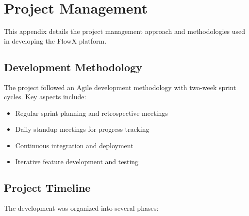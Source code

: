\chapter{Project Management}
This appendix details the project management approach and methodologies used in developing the FlowX platform.

\section{Development Methodology}
The project followed an Agile development methodology with two-week sprint cycles. Key aspects include:

\begin{itemize}
    \item Regular sprint planning and retrospective meetings
    \item Daily standup meetings for progress tracking
    \item Continuous integration and deployment
    \item Iterative feature development and testing
\end{itemize}

\section{Project Timeline}
The development was organized into several phases:


